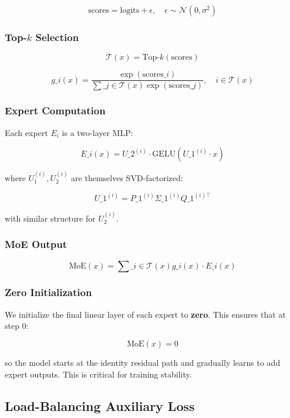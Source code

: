 \[
\text{scores} = \text{logits} + \epsilon, \quad \epsilon \sim \mathcal{N}(0, \sigma^2)
\tag{4.5}
\]

\subsubsection{Top-$k$ Selection}

\[
\mathcal{T}(x) = \text{Top-}k(\text{scores})
\tag{4.6}
\]

\[
g\_i(x) = \frac{\exp(\text{scores}\_i)}{\sum\_{j \in \mathcal{T}(x)} \exp(\text{scores}\_j)}, \quad i \in \mathcal{T}(x)
\tag{4.7}
\]

\subsubsection{Expert Computation}

Each expert $E_i$ is a two-layer MLP:

\[
E\_i(x) = U\_2^{(i)} \cdot \text{GELU}(U\_1^{(i)} \cdot x)
\tag{4.8}
\]

where $U_1^{(i)}, U_2^{(i)}$ are themselves SVD-factorized:

\[
U\_1^{(i)} = P\_1^{(i)} \Sigma\_1^{(i)} Q\_1^{(i)\top}
\tag{4.9}
\]

with similar structure for $U_2^{(i)}$.

\subsubsection{MoE Output}

\[
\text{MoE}(x) = \sum\_{i \in \mathcal{T}(x)} g\_i(x) \cdot E\_i(x)
\tag{4.10}
\]

\subsubsection{Zero Initialization}

We initialize the final linear layer of each expert to \textbf{zero}. This ensures 
that at step 0:

\[
\text{MoE}(x) = 0
\tag{4.11}
\]

so the model starts at the identity residual path and gradually learns to 
add expert outputs. This is critical for training stability.

\subsection{Load-Balancing Auxiliary Loss}

